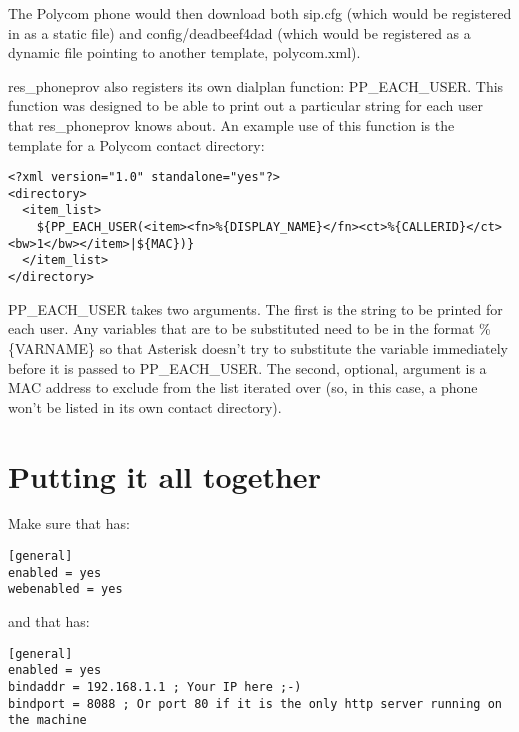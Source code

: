 The Polycom phone would then download both sip.cfg (which would be registered in 
 as a static file) and config/deadbeef4dad (which would be 
registered as a dynamic file pointing to another template, polycom.xml). 

res\_phoneprov also registers its own dialplan function: PP\_EACH\_USER. This function 
was designed to be able to print out a particular string for each user that 
res\_phoneprov knows about. An example use of this function is the template for a Polycom 
contact directory:

\begin{astlisting}
\begin{verbatim}
<?xml version="1.0" standalone="yes"?>
<directory>
  <item_list>
    ${PP_EACH_USER(<item><fn>%{DISPLAY_NAME}</fn><ct>%{CALLERID}</ct><bw>1</bw></item>|${MAC})}
  </item_list>
</directory>
\end{verbatim}
\end{astlisting}

PP\_EACH\_USER takes two arguments.  The first is the string to be printed for each user. 
Any variables that are to be substituted need to be in the format \%\{VARNAME\} so that
Asterisk doesn't try to substitute the variable immediately before it is passed to
PP\_EACH\_USER. The second, optional, argument is a MAC address to exclude from the list 
iterated over (so, in this case, a phone won't be listed in its own contact directory).

\section{Putting it all together}

Make sure that  has:

\begin{astlisting}
\begin{verbatim}
[general]
enabled = yes
webenabled = yes
\end{verbatim}
\end{astlisting}

and that  has:

\begin{astlisting}
\begin{verbatim}
[general]
enabled = yes
bindaddr = 192.168.1.1 ; Your IP here ;-)
bindport = 8088 ; Or port 80 if it is the only http server running on the machine
\end{verbatim}
\end{astlisting}

